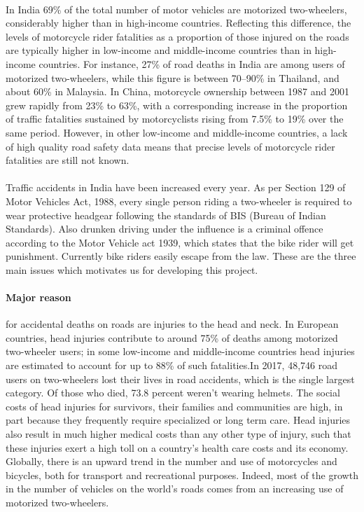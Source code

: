 \paragraph{}In India 69\% of the total number of motor vehicles are motorized two-wheelers, considerably higher
than in high-income countries. Reflecting this difference, the levels of motorcycle rider fatalities as a
proportion of those injured on the roads are typically higher in low-income and middle-income countries
than in high-income countries. For instance, 27\% of road deaths in India are among users of motorized
two-wheelers, while this figure is between 70–90\% in Thailand, and about 60\% in Malaysia. In China,
motorcycle ownership between 1987 and 2001 grew rapidly from 23\% to 63\%, with a corresponding increase in the proportion of traffic fatalities sustained by motorcyclists rising from 7.5\% to 19\% over the
same period. However, in other low-income and middle-income countries, a lack of high quality road
safety data means that precise levels of motorcycle rider fatalities are still not known.\vspace{.5cm}

\paragraph{}Traffic accidents in India have been increased every year. As per Section 129 of Motor Vehicles Act, 1988,
every single person riding a two-wheeler is required to wear protective headgear following the standards
of BIS (Bureau of Indian Standards). Also drunken driving under the influence is a criminal offence
according to the Motor Vehicle act 1939, which states that the bike rider will get punishment. Currently
bike riders easily escape from the law. These are the three main issues which motivates us for developing
this project.
\pagebreak

\paragraph{Major reason}for accidental deaths on roads are injuries to the head and neck. In European countries,
head injuries contribute to around 75\% of deaths among motorized two-wheeler users; in some low-income
and middle-income countries head injuries are estimated to account for up to 88\% of such fatalities.In
2017, 48,746 road users on two-wheelers lost their lives in road accidents, which is the single largest
category. Of those who died, 73.8 percent weren’t wearing helmets. The social costs of head injuries for
survivors, their families and communities are high, in part because they frequently require specialized
or long term care. Head injuries also result in much higher medical costs than any other type of injury,
such that these injuries exert a high toll on a country’s health care costs and its economy. Globally,
there is an upward trend in the number and use of motorcycles and bicycles, both for transport and
recreational purposes. Indeed, most of the growth in the number of vehicles on the world’s roads comes
from an increasing use of motorized two-wheelers.
\vspace{.5cm}

